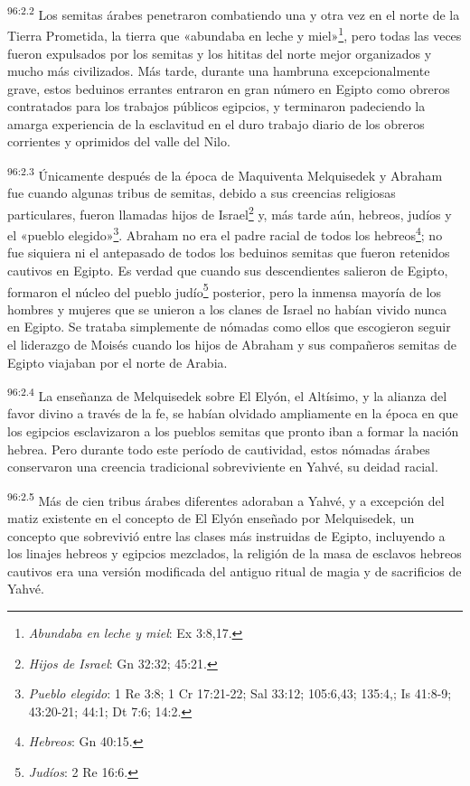 \par
\textsuperscript{96:2.2} Los semitas árabes penetraron combatiendo una y otra vez en el norte de la Tierra Prometida, la tierra que «abundaba en leche y miel»\footnote{\textit{Abundaba en leche y miel}: Ex 3:8,17.}, pero todas las veces fueron expulsados por los semitas y los hititas del norte mejor organizados y mucho más civilizados. Más tarde, durante una hambruna excepcionalmente grave, estos beduinos errantes entraron en gran número en Egipto como obreros contratados para los trabajos públicos egipcios, y terminaron padeciendo la amarga experiencia de la esclavitud en el duro trabajo diario de los obreros corrientes y oprimidos del valle del Nilo.

\par
\textsuperscript{96:2.3} Únicamente después de la época de Maquiventa Melquisedek y Abraham fue cuando algunas tribus de semitas, debido a sus creencias religiosas particulares, fueron llamadas hijos de Israel\footnote{\textit{Hijos de Israel}: Gn 32:32; 45:21.} y, más tarde aún, hebreos, judíos y el «pueblo elegido»\footnote{\textit{Pueblo elegido}: 1 Re 3:8; 1 Cr 17:21-22; Sal 33:12; 105:6,43; 135:4,; Is 41:8-9; 43:20-21; 44:1; Dt 7:6; 14:2.}. Abraham no era el padre racial de todos los hebreos\footnote{\textit{Hebreos}: Gn 40:15.}; no fue siquiera ni el antepasado de todos los beduinos semitas que fueron retenidos cautivos en Egipto. Es verdad que cuando sus descendientes salieron de Egipto, formaron el núcleo del pueblo judío\footnote{\textit{Judíos}: 2 Re 16:6.} posterior, pero la inmensa mayoría de los hombres y mujeres que se unieron a los clanes de Israel no habían vivido nunca en Egipto. Se trataba simplemente de nómadas como ellos que escogieron seguir el liderazgo de Moisés cuando los hijos de Abraham y sus compañeros semitas de Egipto viajaban por el norte de Arabia.

\par
\textsuperscript{96:2.4} La enseñanza de Melquisedek sobre El Elyón, el Altísimo, y la alianza del favor divino a través de la fe, se habían olvidado ampliamente en la época en que los egipcios esclavizaron a los pueblos semitas que pronto iban a formar la nación hebrea. Pero durante todo este período de cautividad, estos nómadas árabes conservaron una creencia tradicional sobreviviente en Yahvé, su deidad racial.

\par
\textsuperscript{96:2.5} Más de cien tribus árabes diferentes adoraban a Yahvé, y a excepción del matiz existente en el concepto de El Elyón enseñado por Melquisedek, un concepto que sobrevivió entre las clases más instruidas de Egipto, incluyendo a los linajes hebreos y egipcios mezclados, la religión de la masa de esclavos hebreos cautivos era una versión modificada del antiguo ritual de magia y de sacrificios de Yahvé.

